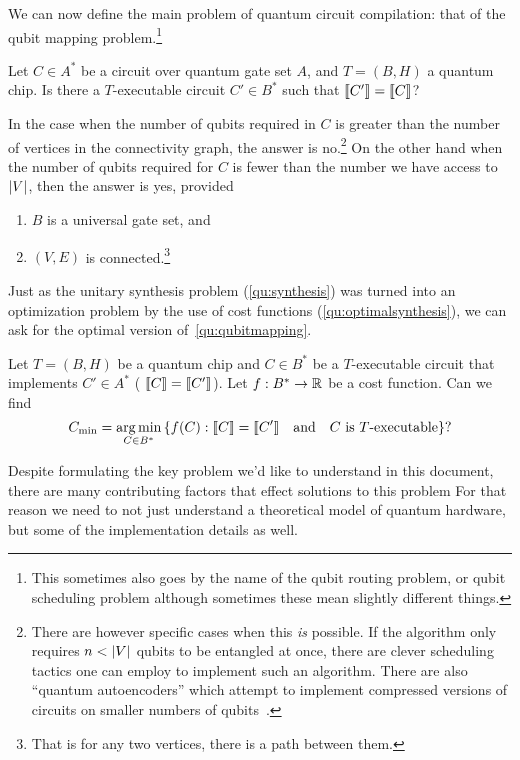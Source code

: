 We can now define the main problem of quantum circuit compilation: that of the qubit mapping problem.\footnote{This sometimes also goes by the name of the qubit routing problem, or qubit scheduling problem although sometimes these mean slightly different things.}
\begin{question}\label{qu:qubitmapping}
    Let $C \in A^*$ be a circuit over quantum gate set $A$, and $T = (B, H)$ a quantum chip.
    Is there a $T$-executable circuit $C' \in B^*$ such that $\llbracket C'\rrbracket = \llbracket C\rrbracket$?
\end{question}
In the case when the number of qubits required in $C$ is greater than the number of vertices in the connectivity graph, the answer is no.\footnote{There are however specific cases when this \emph{is} possible. If the algorithm only requires $n < \abs{V}$ qubits to be entangled at once, there are clever scheduling tactics one can employ to implement such an algorithm. There are also ``quantum autoencoders'' which attempt to implement compressed versions of circuits on smaller numbers of qubits~\cite{autoencode}.}
On the other hand when the number of qubits required for $C$ is fewer than the number we have access to $\abs{V}$, then the answer is yes, provided
\begin{enumerate}
    \item $B$ is a universal gate set, and
    \item $(V, E)$ is connected.\footnote{That is for any two vertices, there is a path between them.}
\end{enumerate}
Just as the unitary synthesis problem (\cref{qu:synthesis}) was turned into an optimization problem by the use of cost functions (\cref{qu:optimalsynthesis}), we can ask for the optimal version of~\cref{qu:qubitmapping}.
\begin{question}
    Let $T = (B, H)$ be a quantum chip and $C \in B^*$ be a $T$-executable circuit that implements $C' \in A^*$ (\ie{} $\llbracket C\rrbracket = \llbracket C'\rrbracket$).
    Let $f: B^* \to \mathbb{R}$ be a cost function.
    Can we find
    \begin{equation}
        C_\text{min} = \operatorname*{arg\,min}_{C \in B^*}\qty{f(C) : \llbracket C\rrbracket = \llbracket C'\rrbracket \quad\text{and}\quad C\text{ is $T$-executable}}?
    \end{equation}
\end{question}

Despite formulating the key problem we'd like to understand in this document, there are many contributing factors that effect solutions to this problem
For that reason we need to not just understand a theoretical model of quantum hardware, but some of the implementation details as well.

